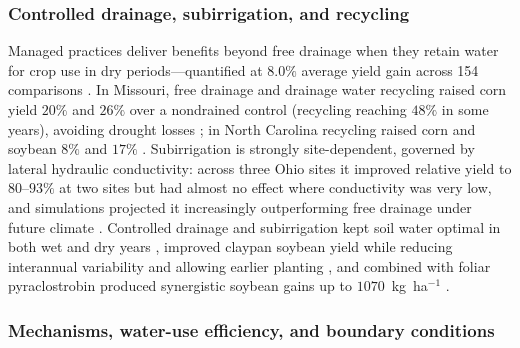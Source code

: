 \subsubsection{Controlled drainage, subirrigation, and recycling}

Managed practices deliver benefits beyond free drainage when they retain water
for crop use in dry periods---quantified at $8.0\%$ average yield gain across
154 comparisons \parencite{Singh2022b}. In Missouri, free drainage and drainage
water recycling raised corn yield $20\%$ and $26\%$ over a nondrained control
(recycling reaching $48\%$ in some years), avoiding drought losses
\parencite{Kaur2021}; in North Carolina recycling raised corn and soybean $8\%$
and $17\%$ \parencite{Moursi2024}. Subirrigation is strongly site-dependent,
governed by lateral hydraulic conductivity: across three Ohio sites it improved
relative yield to $80$--$93\%$ at two sites but had almost no effect where
conductivity was very low, and simulations projected it increasingly
outperforming free drainage under future climate \parencite{Gunn2018,Gunn2019}.
Controlled drainage and subirrigation kept soil water optimal in both wet and
dry years \parencite{Niaghi2019}, improved claypan soybean yield while reducing
interannual variability and allowing earlier planting \parencite{Nelson2011},
and combined with foliar pyraclostrobin produced synergistic soybean gains up
to $1070$~kg~ha$^{-1}$ \parencite{Nelson2011b}.

\subsubsection{Mechanisms, water-use efficiency, and boundary conditions}

